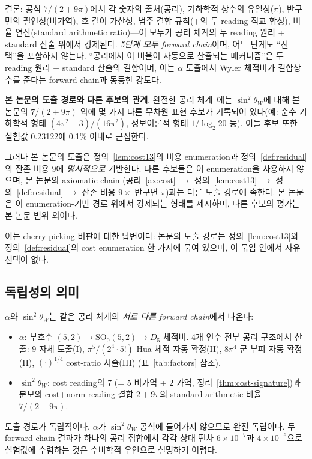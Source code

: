 \documentclass[entropy,article,submit,pdftex,oneauthor]{Definitions/mdpi}
\begin{document}
결론: 공식 $7/(2+9\pi)$에서 각 숫자의 출처(공리), 기하학적 상수의 유일성($\pi$), 반구면의 필연성(비가역), 호 길이 가산성, 범주 결합 규칙($+$의 두 reading 직교 합성), 비율 연산(standard arithmetic ratio)---이 모두가 공리 체계의 두 reading 원리 + standard 산술 위에서 강제된다. \emph{5단계 모두 forward chain}이며, 어느 단계도 ``선택''을 포함하지 않는다. ``공리에서 이 비율이 자동으로 산출되는 메커니즘''은 두 reading 원리 + standard 산술의 결합이며, 이는 $\alpha$ 도출에서 Wyler 체적비가 결합상수를 준다는 forward chain과 동등한 강도다.

\textbf{본 논문의 도출 경로와 다른 후보의 관계}. 완전한 공리 체계~\cite{han2026}에는 $\sin^2\theta_W$에 대해 본 논문의 $7/(2+9\pi)$ 외에 몇 가지 다른 무차원 표현 후보가 기록되어 있다(예: 순수 기하학적 형태 $(4\pi^2-3)/(16\pi^2)$, 정보이론적 형태 $1/\log_2 20$ 등). 이들 후보 또한 실험값 0.23122에 0.1\% 이내로 근접한다.

그러나 본 논문의 도출은 정의~\ref{lem:cost13}의 비용 enumeration과 정의~\ref{def:residual}의 잔존 비용 $9$에 \emph{명시적으로} 기반한다. 다른 후보들은 이 enumeration을 사용하지 않으며, 본 논문의 axiomatic chain (공리~\ref{ax:cost} $\to$ 정의~\ref{lem:cost13} $\to$ 정의~\ref{def:residual} $\to$ 잔존 비용 $9 \times$ 반구면 $\pi$)과는 다른 도출 경로에 속한다. 본 논문은 이 enumeration-기반 경로 위에서 강제되는 형태를 제시하며, 다른 후보의 평가는 본 논문 범위 외이다.

이는 cherry-picking 비판에 대한 답변이다: 논문의 도출 경로는 정의~\ref{lem:cost13}와 정의~\ref{def:residual}의 cost enumeration 한 가지에 묶여 있으며, 이 묶임 안에서 자유 선택이 없다.

\subsection{독립성의 의미}

$\alpha$와 $\sin^2\theta_W$는 같은 공리 체계의 \emph{서로 다른 forward chain}에서 나온다:
\begin{itemize}
\item $\alpha$: 부호수 $(5,2) \to \mathrm{SO}_0(5,2) \to D_5$ 체적비. 4개 인수 전부 공리 구조에서 산출: $9$ 자체 도출(I), $\pi^5/(2^4 \cdot 5!)$ Hua 체적 자동 확정(II), $8\pi^4$ 군 부피 자동 확정(II), $(\cdot)^{1/4}$ cost-ratio 서술(III) (표~\ref{tab:factors} 참조).
\item $\sin^2\theta_W$: cost reading의 7 (= 5 비가역 + 2 가역, 정리~\ref{thm:cost-signature})과 분모의 cost+norm reading 결합 $2 + 9\pi$의 standard arithmetic 비율 $7/(2 + 9\pi)$.
\end{itemize}
도출 경로가 독립적이다. $\alpha$가 $\sin^2\theta_W$ 공식에 들어가지 않으므로 완전 독립이다. 두 forward chain 결과가 하나의 공리 집합에서 각각 상대 편차 $6 \times 10^{-7}$과 $4 \times 10^{-6}$으로 실험값에 수렴하는 것은 수비학적 우연으로 설명하기 어렵다.
\end{document}
